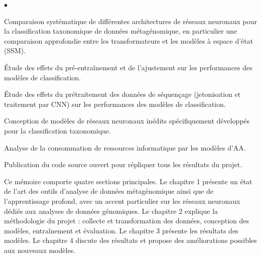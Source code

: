 \begin{introduction}
\begin{list}{$\bullet$}{}
    \item Comparaison systématique de différentes architectures de réseaux neuronaux pour la
        classification taxonomique de données métagénomique, en particulier une comparaison
        approfondie entre les transformateurs et les modèles à espace d'état (SSM).
    \item Étude des effets du pré-entraînement et de l'ajustement sur les performances des modèles
        de classification.
    \item Étude des effets du prétraitement des données de séquençage (jetonisation et traitement
        par CNN) sur les performances des modèles de classification.
    \item Conception de modèles de réseaux neuronaux inédits spécifiquement développés pour la
        classification taxonomique.
    \item Analyse de la consommation de ressources informatique par les modèles d'AA.
    \item Publication du code source ouvert pour répliquer tous les résultats du projet.
\end{list}

Ce mémoire comporte quatre sections principales. Le chapitre 1 présente un état de l'art des outils
d'analyse de données métagénomique ainsi que de l'apprentissage profond, avec un accent particulier
sur les réseaux neuronaux dédiés aux analyses de données génomiques. Le chapitre 2 explique la
méthodologie du projet : collecte et transformation des données, conception des modèles,
entraînement et évaluation. Le chapitre 3 présente les résultats des modèles. Le chapitre 4 discute
des résultats et propose des améliorations possibles aux nouveaux modèles.

\end{introduction}
